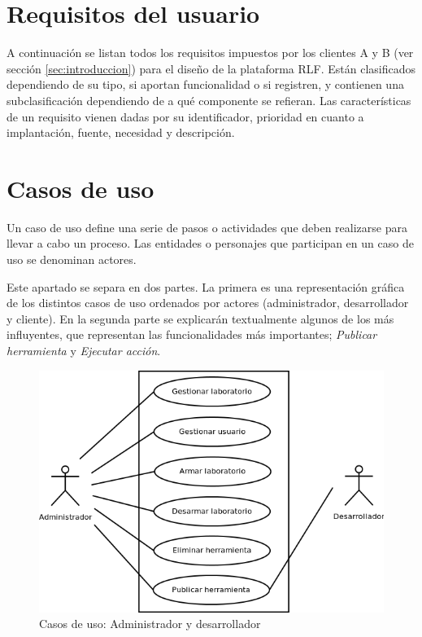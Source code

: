 \section{Requisitos del usuario}
A continuación se listan todos los requisitos impuestos por los 
clientes A y B (ver sección \ref{sec:introduccion})
para el diseño de la plataforma RLF. Están clasificados dependiendo 
de su tipo, si aportan funcionalidad o si registren, y contienen una 
subclasificación dependiendo de a qué componente se refieran. Las 
características de un requisito vienen dadas por su identificador, 
prioridad en cuanto a implantación, fuente, necesidad y descripción.



\section{Casos de uso}
Un caso de uso define una serie de pasos o actividades que deben 
realizarse para llevar a cabo un proceso. Las entidades o personajes 
que participan en un caso de uso se denominan actores.

Este apartado se separa en dos partes. La primera es una 
representación gráfica de los distintos casos de uso ordenados por 
actores (administrador, desarrollador y cliente). En la segunda parte 
se explicarán textualmente algunos de los más influyentes, que 
representan las funcionalidades más importantes; \emph{Publicar 
herramienta} y \emph{Ejecutar acción}.

\begin{figure}[h]
	\centering
	\includegraphics[scale=0.6]{images/casos1.png}
	\caption{Casos de uso: Administrador y desarrollador}
	\label{fig:casos1}
\end{figure}

